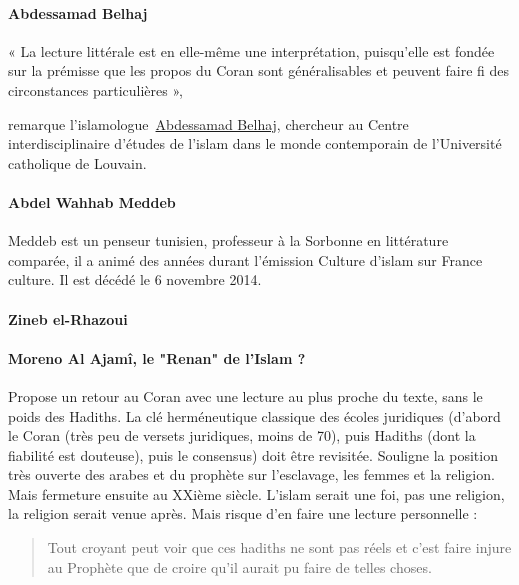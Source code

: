 \paragraph{Abdessamad
Belhaj}
\begin{cite}
« La lecture littérale est en elle-même une
interprétation, puisqu'elle est fondée sur la prémisse que les propos du
Coran sont généralisables et peuvent faire fi des circonstances
particulières »,~
\end{cite}
remarque
l'islamologue~{\underline{Abdessamad
Belhaj}}, chercheur au Centre interdisciplinaire d'études de l'islam
dans le monde contemporain de l'Université catholique de Louvain.

\paragraph{Abdel Wahhab Meddeb}
{Meddeb est
    un penseur tunisien}, professeur à la Sorbonne en littérature
    comparée, il a animé des années durant l'émission Culture d'islam
    sur France culture. Il est décédé le 6 novembre 2014.



\paragraph{Zineb el-Rhazoui}

\paragraph{Moreno Al Ajamî, le "Renan" de l'Islam ?} Propose un retour au Coran avec une lecture au plus proche du texte, sans le poids des Hadiths. La clé herméneutique classique des écoles juridiques (d'abord le Coran (très peu de versets juridiques, moins de 70), puis Hadiths (dont la fiabilité est douteuse), puis le consensus) doit être revisitée.
Souligne la position très ouverte des arabes et du prophète sur l'esclavage, les femmes et la religion. Mais fermeture ensuite au XXième siècle. L'islam serait une foi, pas une religion, la religion serait venue après. Mais risque d'en faire une lecture personnelle : 
\begin{quote}
    Tout croyant peut voir que ces hadiths ne sont pas réels et c'est faire injure au Prophète que de croire qu'il aurait pu faire de telles choses.
\end{quote}

